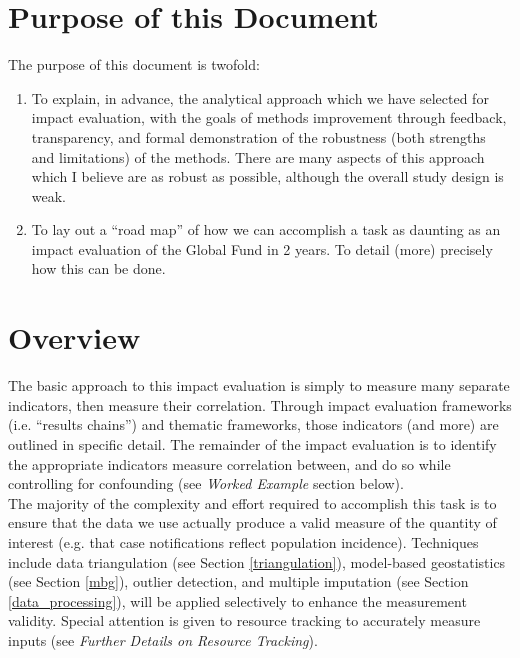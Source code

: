 \documentclass[twocolumn]{bmcart}%
\begin{document}
\section{Purpose of this Document}
The purpose of this document is twofold:

\begin{enumerate}
  \item To explain, in advance, the analytical approach which we have selected for impact evaluation, with the goals of methods improvement through feedback, transparency, and formal demonstration of the robustness (both strengths and limitations) of the methods. There are many aspects of this approach which I believe are as robust as possible, although the overall study design is weak.
  \item To lay out a ``road map'' of how we can accomplish a task as daunting as an impact evaluation of the Global Fund in 2 years. To detail (more) precisely how this can be done.
\end{enumerate}


\section{Overview}
The basic approach to this impact evaluation is simply to measure many separate indicators, then measure their correlation. Through impact evaluation frameworks (i.e. ``results chains'') and thematic frameworks, those indicators (and more) are outlined in specific detail. The remainder of the impact evaluation is to identify the appropriate indicators measure correlation between, and do so while controlling for confounding (see \textit{Worked Example} section below). \\

The majority of the complexity and effort required to accomplish this task is to ensure that the data we use actually produce a valid measure of the quantity of interest (e.g. that case notifications reflect population incidence). Techniques include data triangulation (see Section \ref{triangulation}), model-based geostatistics (see Section \ref{mbg}), outlier detection, and multiple imputation (see Section \ref{data_processing}), will be applied selectively to enhance the measurement validity. Special attention is given to resource tracking to accurately measure inputs (see \textit{Further Details on Resource Tracking}).  \\
\end{document}

